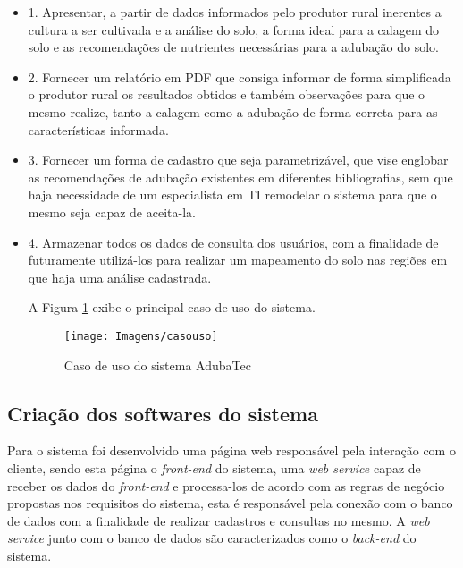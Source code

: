 \documentclass[
12pt,				%
oneside,			%
a4paper,			%
english,			%
french,				%
spanish,			%
brazil				%
]{abntex2}
\begin{document}
\begin{itemize}

\item 1. Apresentar, a partir de dados informados pelo produtor rural inerentes a cultura a
ser cultivada e a análise do solo, a forma ideal para a calagem do solo e as recomendações de nutrientes necessárias para a adubação do solo.

\item 2. Fornecer um relatório em PDF que consiga informar de forma simplificada o produtor
rural os resultados obtidos e também observações para que o mesmo realize, tanto a calagem como a adubação de forma correta para as características informada.

\item 3. Fornecer um forma de cadastro que seja parametrizável, que vise englobar as recomendações de adubação existentes em diferentes bibliografias, sem que haja necessidade de um especialista em TI remodelar o sistema para que o mesmo seja capaz de aceita-la.

\item 4. Armazenar todos os dados de consulta dos usuários, com a finalidade de futuramente utilizá-los para realizar um mapeamento do solo nas regiões em que haja uma análise cadastrada.

A Figura \ref{figura:casouso} exibe o principal caso de uso do sistema.

\begin{figure}[H]
	\caption{Caso de uso do sistema AdubaTec}
	\centering %
	\texttt{[image: Imagens/casouso]} %
	\label{figura:casouso}
\end{figure}



\end{itemize}

\subsection{Criação dos softwares do sistema }

Para o sistema foi desenvolvido uma página web responsável pela interação com o cliente, sendo esta página o \textit{front-end} do sistema, uma \textit{web service} capaz de receber os dados do  \textit{front-end} e processa-los de acordo com as regras de negócio propostas nos requisitos do sistema, esta é responsável pela conexão com o banco de dados com a finalidade de realizar cadastros e consultas no mesmo. A  \textit{web service} junto com o banco de dados são caracterizados como o \textit{back-end} do sistema.
\end{document}

